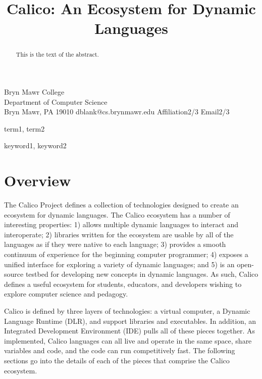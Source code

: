 \documentclass[preprint]{sigplanconf}
\begin{document}
\copyrightdata{[to be supplied]} 




\title{Calico: An Ecosystem for Dynamic Languages}


           {Bryn Mawr College\\Department of Computer Science\\Bryn Mawr, PA 19010}
           {dblank@cs.brynmawr.edu}
           {Affiliation2/3}
           {Email2/3}


\maketitle


\begin{abstract}
This is the text of the abstract.
\end{abstract}



\terms
term1, term2

\keywords
keyword1, keyword2

\section{Overview}

The Calico Project defines a collection of technologies designed to
create an ecosystem for dynamic languages. The Calico ecosystem has a
number of interesting properties: 1) allows multiple dynamic languages
to interact and interoperate; 2) libraries written for the ecosystem
are usable by all of the languages as if they were native to each
language; 3) provides a smooth continuum of experience for the
beginning computer programmer; 4) exposes a unified interface for
exploring a variety of dynamic languages; and 5) is an open-source
testbed for developing new concepts in dynamic languages. As such,
Calico defines a useful ecosystem for students, educators, and
developers wishing to explore computer science and pedagogy.

Calico is defined by three layers of technologies: a virtual computer,
a Dynamic Language Runtime (DLR), and support libraries and
executables. In addition, an Integrated Development Environment (IDE)
pulls all of these pieces together. As implemented, Calico languages
can all live and operate in the same space, share variables and code,
and the code can run competitively fast. The following sections go
into the details of each of the pieces that comprise the Calico
ecosystem.
\end{document}
